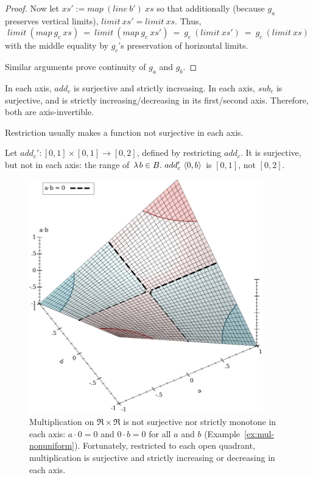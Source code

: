 \begin{proof}
Now let $xs' := map~(line~b')~xs$ so that additionally (because $g_a$ preserves vertical limits), $limit~xs' = limit~xs$.
Thus,
\begin{equation}
	limit~(map~g_c~xs)\ =\ limit~(map~g_c~xs')\ =\ g_c~(limit~xs')\ =\ g_c~(limit~xs)
\end{equation}
with the middle equality by $g_c$'s preservation of horizontal limits.

Similar arguments prove continuity of $g_a$ and $g_b$.
\end{proof}

\begin{example}
In each axis, $add_c$ is surjective and strictly increasing.
In each axis, $sub_c$ is surjective, and is strictly increasing/decreasing in its first/second axis.
Therefore, both are axis-invertible.
\exampleqed
\end{example}

Restriction usually makes a function not surjective in each axis.

\begin{example}
Let $add_c' : [0,1] \times [0,1] \to [0,2]$, defined by restricting $add_c$.
It is surjective, but not in each axis: the range of $\lambda\mspace{2mu}{b \in B}\ldotp\, add_c'~\langle{0,b}\rangle$ is $[0,1]$, not $[0,2]$.
\exampleqed
\end{example}

\begin{figure}[!tb]
\centering
\includegraphics[width=4in]{figures/mul-nonuniform-properties}
\caption[Multiplication on $\Re \times \Re$]{Multiplication on $\Re \times \Re$ is not surjective nor strictly monotone in each axis: $a \cdot 0 = 0$ and $0 \cdot b = 0$ for all $a$ and $b$ (Example~\ref{ex:mul-nonuniform}).
Fortunately, restricted to each open quadrant, multiplication is surjective and strictly increasing or decreasing in each axis.}
\label{fig:mul-nonuniform}
\end{figure}

